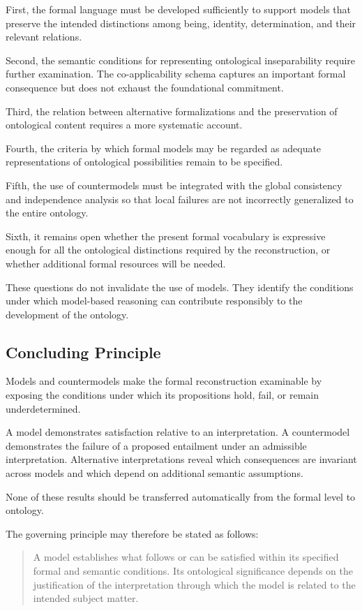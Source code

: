 First, the formal language must be developed sufficiently
to support models that preserve the intended
distinctions among being, identity, determination,
and their relevant relations.

Second, the semantic conditions for representing
ontological inseparability require further examination.
The co-applicability schema captures an important
formal consequence but does not exhaust the
foundational commitment.

Third, the relation between alternative formalizations
and the preservation of ontological content requires
a more systematic account.

Fourth, the criteria by which formal models may be
regarded as adequate representations of ontological
possibilities remain to be specified.

Fifth, the use of countermodels must be integrated
with the global consistency and independence analysis
so that local failures are not incorrectly generalized
to the entire ontology.

Sixth, it remains open whether the present formal
vocabulary is expressive enough for all the
ontological distinctions required by the reconstruction,
or whether additional formal resources will be needed.

These questions do not invalidate the use of models.
They identify the conditions under which model-based
reasoning can contribute responsibly to the development
of the ontology.

\subsection{Concluding Principle}

Models and countermodels make the formal reconstruction
examinable by exposing the conditions under which
its propositions hold, fail, or remain underdetermined.

A model demonstrates satisfaction relative to an
interpretation. A countermodel demonstrates the
failure of a proposed entailment under an admissible
interpretation. Alternative interpretations reveal
which consequences are invariant across models
and which depend on additional semantic assumptions.

None of these results should be transferred
automatically from the formal level to ontology.

The governing principle may therefore be stated
as follows:

\begin{quote}
A model establishes what follows or can be satisfied
within its specified formal and semantic conditions.
Its ontological significance depends on the
justification of the interpretation through which
the model is related to the intended subject matter.
\end{quote}

